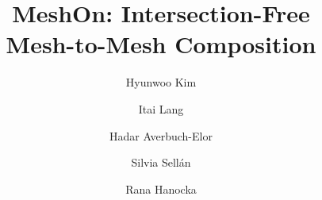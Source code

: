 \documentclass[runningheads]{llncs}
\begin{document}

\title{MeshOn: Intersection-Free\\Mesh-to-Mesh Composition}



\author{Hyunwoo Kim \and
Itai Lang \and Hadar Averbuch-Elor \and Silvia Sellán \and Rana Hanocka}

\maketitle


% 








% 

\newpage
{\small


}
\newpage

\end{document}
